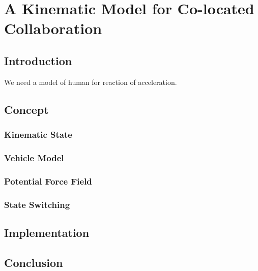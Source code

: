 \chapter{A Kinematic Model for Co-located Collaboration}
\label{chapter:kinematics}
\minitoc

\section{Introduction}
We need a model of human for reaction of acceleration.

\section{Concept}
\subsection{Kinematic State}
\subsection{Vehicle Model}
\subsection{Potential Force Field}
\subsection{State Switching}

\section{Implementation}

\section{Conclusion}
